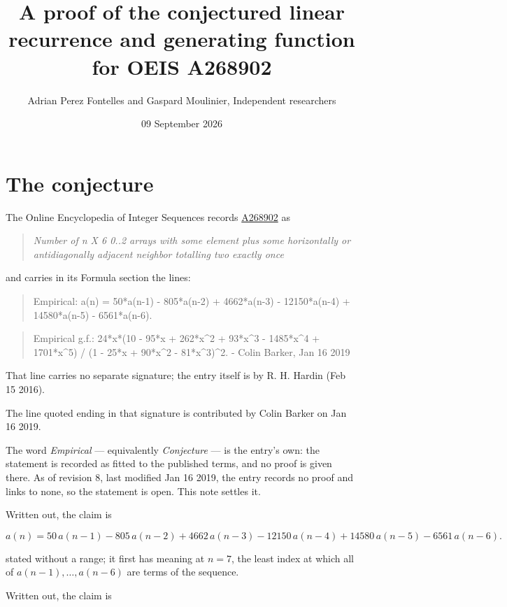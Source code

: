 \documentclass[11pt]{article}
\title{A proof of the conjectured linear recurrence and generating function for OEIS A268902}
\author{Adrian Perez Fontelles and Gaspard Moulinier, Independent researchers}
\date{09 September 2026}
\theoremstyle{definition}
\begin{document}
\maketitle
\section{The conjecture}

The Online Encyclopedia of Integer Sequences records \href{https://oeis.org/A268902}{A268902} as

\begin{quote}\itshape Number of n X 6 0..2 arrays with some element plus some horizontally or antidiagonally adjacent neighbor totalling two exactly once\end{quote}

and carries in its Formula section the lines:

\begin{quote}\ttfamily Empirical: a(n) = 50*a(n-1) - 805*a(n-2) + 4662*a(n-3) - 12150*a(n-4) + 14580*a(n-5) - 6561*a(n-6).\end{quote}

\begin{quote}\ttfamily Empirical g.f.: 24*x*(10 - 95*x + 262*x\textasciicircum{}2 + 93*x\textasciicircum{}3 - 1485*x\textasciicircum{}4 + 1701*x\textasciicircum{}5) / (1 - 25*x + 90*x\textasciicircum{}2 - 81*x\textasciicircum{}3)\textasciicircum{}2. - Colin Barker, Jan 16 2019\end{quote}

That line carries no separate signature; the entry itself is by R. H. Hardin (Feb 15 2016).

The line quoted ending in that signature is contributed by Colin Barker on Jan 16 2019.

The word {\itshape Empirical} --- equivalently {\itshape Conjecture} --- is the entry's own: the statement is recorded as fitted to the published terms, and no proof is given there. As of revision 8, last modified Jan 16 2019, the entry records no proof and links to none, so the statement is open. This note settles it.

Written out, the claim is

\[a(n) = 50\,a(n-1) - 805\,a(n-2) + 4662\,a(n-3) - 12150\,a(n-4) + 14580\,a(n-5) - 6561\,a(n-6).\]

stated without a range; it first has meaning at $n = 7$, the least index at which all of $a(n-1),\dots,a(n-6)$ are terms of the sequence.

Written out, the claim is
\end{document}
